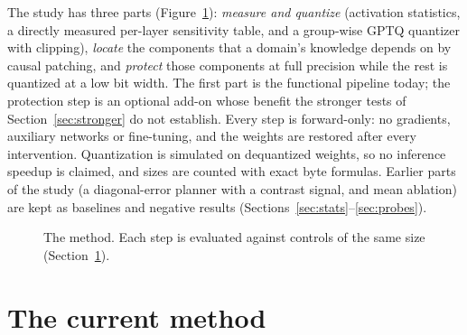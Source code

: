 \documentclass[11pt]{article}
\begin{document}
The study has three parts (Figure~\ref{fig:pipeline}): \emph{measure and quantize} (activation statistics, a directly measured per-layer sensitivity table,
and a group-wise GPTQ quantizer with clipping), \emph{locate} the components that a domain's knowledge depends on by causal patching, and
\emph{protect} those components at full precision while the rest is quantized at a low bit width. The first part is the functional pipeline today;
the protection step is an optional add-on whose benefit the stronger tests of Section~\ref{sec:stronger} do not establish. Every step is
forward-only: no gradients, auxiliary networks or fine-tuning, and the weights are restored after every intervention.
Quantization is simulated on dequantized weights, so no inference speedup is claimed, and sizes are counted with exact byte
formulas. Earlier parts of the study (a diagonal-error planner with a contrast signal, and mean ablation) are kept as
baselines and negative results (Sections~\ref{sec:stats}--\ref{sec:probes}).

\begin{figure}[h]
\centering
{}
\caption{The method. Each step is evaluated against controls of the same size (Section~\ref{sec:method}).}
\label{fig:pipeline}
\end{figure}

\section{The current method}
\label{sec:method}
\end{document}
